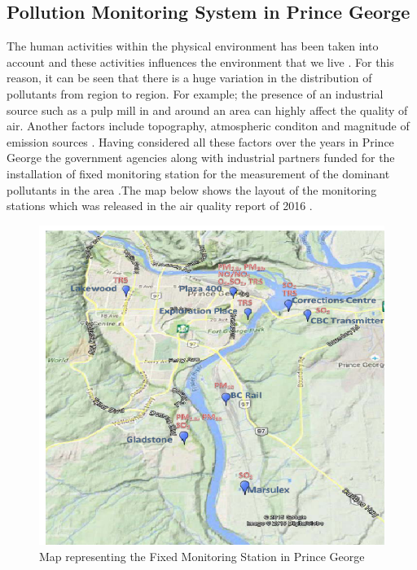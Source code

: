 \subsection{Pollution Monitoring System in Prince George}

 The human activities within the physical environment has been taken into account and these activities influences the environment that we live \cite{Manisalidis2020}. For this reason, it can be seen that there is a huge variation in the distribution of pollutants from region to region. For example; the presence of an industrial source such as a pulp mill in and around an area can highly affect the quality of air. Another factors include topography, atmospheric conditon and magnitude of emission sources \cite{Prevention2000}. Having considered all these factors over the years in Prince George the government agencies along with industrial partners funded for the installation of fixed monitoring station for the measurement of the dominant pollutants in the area \cite{Authority2011}.The map below shows the layout of the monitoring stations which was released in the air quality report of 2016 \cite{Environment2016}.

 
\begin{figure}[h]
  \begin{center}
  \includegraphics[scale=0.80]{./images/figure19.png}
  \end{center}
 
  \caption{Map representing the Fixed Monitoring Station in Prince George \cite{Environment2016}}
  
  \label{Map}
\end{figure}

